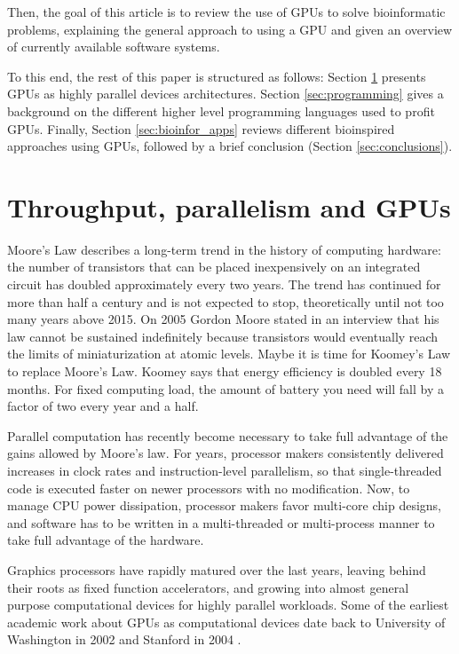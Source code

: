 \documentclass[prodmode,acmtecs]{acmsmall}
\begin{document}
Then, the goal of this article is to review the use of GPUs to solve bioinformatic problems, explaining the general approach to using a GPU and given an overview of currently available software systems.

To this end, the rest of this paper is structured as follows: Section \ref{sec:parall_and_GPUs} presents GPUs as highly parallel devices architectures.
Section \ref{sec:programming} gives a background on the different higher level programming languages used to profit GPUs. Finally, Section \ref{sec:bioinfor_apps} reviews different bioinspired approaches using GPUs, followed by a brief conclusion (Section \ref{sec:conclusions}).

\section{Throughput, parallelism and GPUs}
\label{sec:parall_and_GPUs}

Moore's Law describes a long-term trend in the history of computing hardware: the number of transistors that can be placed inexpensively on an integrated circuit has doubled approximately every two years. The trend has continued for more than half a century and is not expected to stop, theoretically until not too many years above 2015. On 2005 Gordon Moore stated in an interview that his law cannot be sustained indefinitely because transistors would eventually reach the limits of miniaturization at atomic levels. Maybe it is time for Koomey's Law \cite{10.1109/MAHC.2010.28} to replace Moore's Law. Koomey says that energy efficiency is doubled every 18 months. For fixed computing load, the amount of battery you need will fall by a factor of two every year and a half.

Parallel computation has recently become necessary to take full advantage of the gains allowed by Moore's law. For years, processor makers consistently delivered increases in clock rates and instruction-level parallelism, so that single-threaded code is executed faster on newer processors with no modification. Now, to manage CPU power dissipation, processor makers favor multi-core chip designs, and software has to be written in a multi-threaded or multi-process manner to take full advantage of the hardware.

Graphics processors have rapidly matured over the last years, leaving behind their roots as fixed function accelerators, and growing into almost general purpose computational devices for highly parallel workloads. Some of the earliest academic work about GPUs as computational devices date back to University of Washington in 2002 \cite{Thompson:2002:UMG:774861.774894} and Stanford in 2004 \cite{Buck:2004:BGS:1015706.1015800}. 
\end{document}
